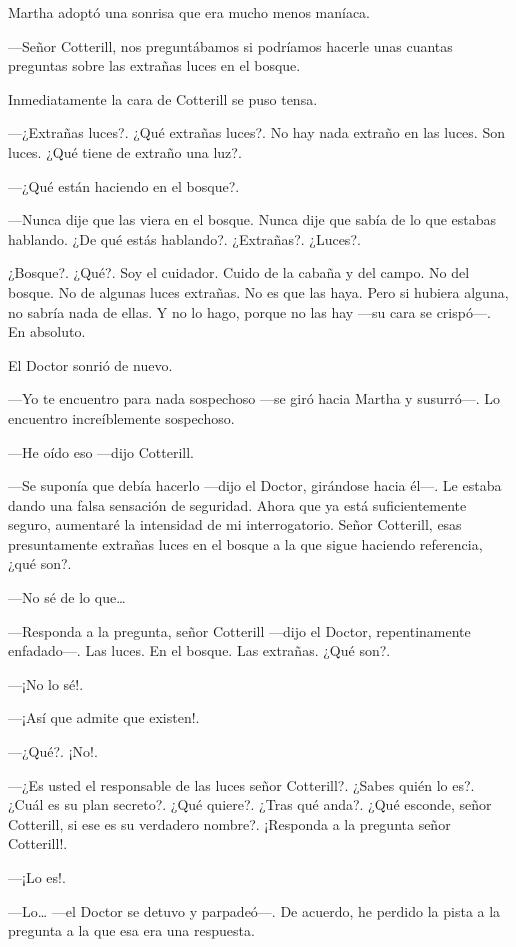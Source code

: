 Martha adoptó una sonrisa que era mucho menos maníaca.

---Señor Cotterill, nos preguntábamos si podríamos hacerle unas cuantas preguntas sobre las extrañas luces en el bosque.

Inmediatamente la cara de Cotterill se puso tensa.

---¿Extrañas luces?. ¿Qué extrañas luces?. No hay nada extraño en las luces. Son luces. ¿Qué tiene de extraño una luz?.

---¿Qué están haciendo en el bosque?.

---Nunca dije que las viera en el bosque. Nunca dije que sabía de lo que estabas hablando. ¿De qué estás hablando?. ¿Extrañas?. ¿Luces?.

¿Bosque?. ¿Qué?. Soy el cuidador. Cuido de la cabaña y del campo. No del bosque. No de algunas luces extrañas. No es que las haya. Pero si hubiera alguna, no sabría nada de ellas. Y no lo hago, porque no las hay ---su cara se crispó---. En absoluto.

El Doctor sonrió de nuevo.

---Yo te encuentro para nada sospechoso ---se giró hacia Martha y susurró---. Lo encuentro increíblemente sospechoso.

---He oído eso ---dijo Cotterill.

---Se suponía que debía hacerlo ---dijo el Doctor, girándose hacia él---. Le estaba dando una falsa sensación de seguridad. Ahora que ya está suficientemente seguro, aumentaré la intensidad de mi interrogatorio. Señor Cotterill, esas presuntamente extrañas luces en el bosque a la que sigue haciendo referencia, ¿qué son?.

---No sé de lo que\ldots{}

---Responda a la pregunta, señor Cotterill ---dijo el Doctor, repentinamente enfadado---. Las luces. En el bosque. Las extrañas. ¿Qué son?.

---¡No lo sé!.

---¡Así que admite que existen!.

---¿Qué?. ¡No!.

---¿Es usted el responsable de las luces señor Cotterill?. ¿Sabes quién lo es?. ¿Cuál es su plan secreto?. ¿Qué quiere?. ¿Tras qué anda?. ¿Qué esconde, señor Cotterill, si ese es su verdadero nombre?. ¡Responda a la pregunta señor Cotterill!.

---¡Lo es!.

---Lo\ldots{} ---el Doctor se detuvo y parpadeó---. De acuerdo, he perdido la pista a la pregunta a la que esa era una respuesta.

